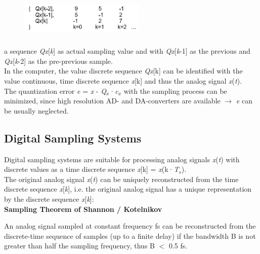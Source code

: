     \begin{figure}[h]
    \centering
    \includegraphics[width=6cm, height=2cm]{Images/image183.png}
    \label{fig:Fig 89}
    \end{figure}

a sequence \textit{Qx}[\textit{k}] as actual sampling value and with \textit{Qx}[\textit{k}-1] as the previous and \textit{Qx}[\textit{k}-2] as the pre-previous sample.\\

In the computer, the value discrete sequence \textit{Qx}[k] can be identified with the value continuous, time discrete sequence \textit{x}[k] and thus the analog signal \textit{x}(\textit{t}). \\

The quantization error \textit{e} = \textit{x} - \textit{Q${}_{x}$}·\textit{c${}_{x}$} with the sampling process can be minimized, since high resolution AD- and DA-converters are available
$\rightarrow$  \textit{e} can be usually neglected.

\subsection{Digital Sampling Systems}

Digital sampling systems are suitable for processing analog signals \textit{x}(\textit{t}) with discrete values as a time discrete sequence \textit{x}[k] = \textit{x}(k·\textit{T${}_{s}$}). \\

The original analog signal \textit{x}(\textit{t}) can be uniquely reconstructed from the time discrete sequence \textit{x}[\textit{k}], i.e. the original analog signal has a unique representation by the discrete sequence \textit{x}[\textit{k}]:\\

{\rot\bf Sampling Theorem of Shannon / Kotelnikov}

\begin{tcolorbox}[colback=blue!5!white,colframe=blue!75!black]
An analog signal sampled at constant frequency fs can be reconstructed from the discrete-time sequence of samples (up to a finite delay) if the bandwidth B is not greater than half the sampling frequency, thus B $<$ 0.5 fs.
\end{tcolorbox}

